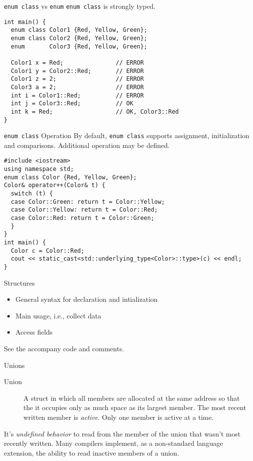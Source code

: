 \documentclass[presentation]{beamer}
\begin{document}
\begin{frame}[fragile,label={sec:orgheadline54}]{\texttt{enum class} vs \texttt{enum}}
 \texttt{enum class} is strongly typed.

\begin{verbatim}
int main() {
  enum class Color1 {Red, Yellow, Green};
  enum class Color2 {Red, Yellow, Green};
  enum       Color3 {Red, Yellow, Green};

  Color1 x = Red;               // ERROR
  Color1 y = Color2::Red;       // ERROR
  Color1 z = 2;                 // ERROR
  Color3 a = 2;                 // ERROR
  int i = Color1::Red;          // ERROR
  int j = Color3::Red;          // OK
  int k = Red;                  // OK, Color3::Red
}
\end{verbatim}
\end{frame}

\begin{frame}[fragile,label={sec:orgheadline55}]{\texttt{enum class} Operation}
 By default, \texttt{enum class} supports assignment, initialization and
comparisons.  Additional operation may be defined.

\begin{verbatim}
#include <iostream>
using namespace std;
enum class Color {Red, Yellow, Green};
Color& operator++(Color& t) {
  switch (t) {
  case Color::Green: return t = Color::Yellow;
  case Color::Yellow: return t = Color::Red;
  case Color::Red: return t = Color::Green;
  }
}
int main() {
  Color c = Color::Red;
  cout << static_cast<std::underlying_type<Color>::type>(c) << endl;
}
\end{verbatim}
\end{frame}

\begin{frame}[label={sec:orgheadline56}]{Structures}
\begin{itemize}
\item General syntax for declaration and intialization
\item Main usage, i.e., collect data
\item Access fields
\end{itemize}

See the accompany code and comments.
\end{frame}

\begin{frame}[label={sec:orgheadline57}]{Unions}
\begin{description}
\item[{Union}] A struct in which all members are allocated at the same
address so that the it occupies only as much space as its
largest member.  The most recent written member is \emph{active}.
Only one member is active at a time.
\end{description}


It's \emph{undefined behavior} to read from the member of the union that
wasn't most recently written.  Many compilers implement, as a
non-standard language extension, the ability to read inactive
members of a union.
\end{frame}
\end{document}
